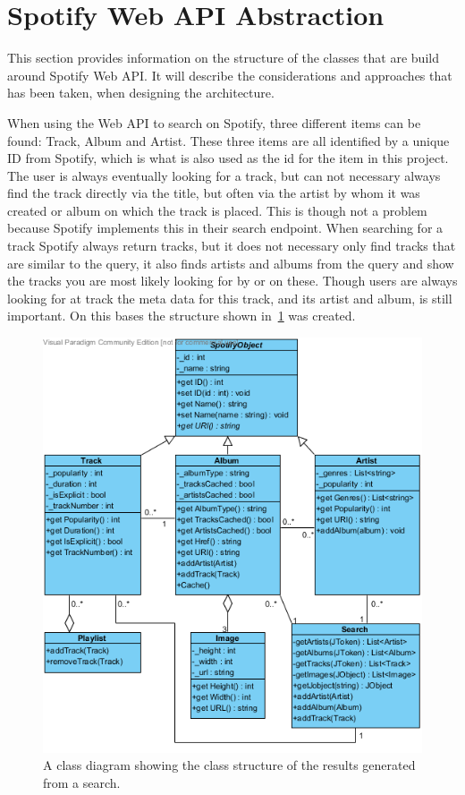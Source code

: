 \section{Spotify Web API Abstraction}
\label{imp:spotify_web_api}
This section provides information on the structure of the classes that are build around Spotify Web API. It will describe the considerations and approaches that has been taken, when designing the architecture.

When using the Web API to search on Spotify, three different items can be found: Track, Album and Artist. These three items are all identified by a unique ID from Spotify, which is what is also used as the id for the item in this project. The user is always eventually looking for a track, but can not necessary always find the track directly via the title, but often via the artist by whom it was created or album on which the track is placed. This is though not a problem because Spotify implements this in their search endpoint. When searching for a track Spotify always return tracks, but it does not necessary only find tracks that are similar to the query, it also finds artists and albums from the query and show the tracks you are most likely looking for by or on these. Though users are always looking for at track the meta data for this track, and its artist and album, is still important. On this bases the structure shown in~\cref{fig:WebAPIUML} was created.

\begin{figure}[hbtp]
\centering
\includegraphics[width=\textwidth]{Images/WebAPIUML.png}
\caption[Class structure of the results generated from a search.]{A class diagram showing the class structure of the results generated from a search.}
\label{fig:WebAPIUML}
\end{figure}

